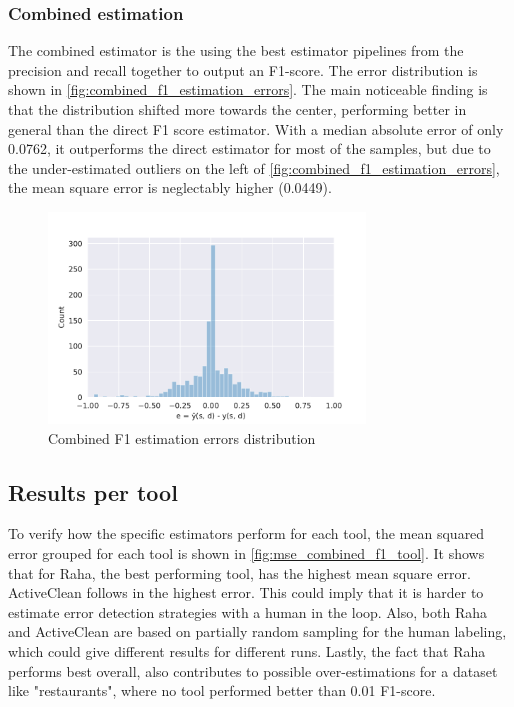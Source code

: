 \subsubsection{Combined estimation}
The combined estimator is the using the best estimator pipelines from the precision and recall together to output an F1-score. The error distribution is shown in \autoref{fig:combined_f1_estimation_errors}. The main noticeable finding is that the distribution shifted more towards the center, performing better in general than the direct F1 score estimator. With a median absolute error of only 0.0762, it outperforms the direct estimator for most of the samples, but due to the under-estimated outliers on the left of \autoref{fig:combined_f1_estimation_errors}, the mean square error is neglectably higher (0.0449). 

\begin{figure}[h]
    \centering
    \includegraphics[width=0.75\textwidth]{thesis/Figures/RQ2/15_error_histogramcell_f1_combined.pdf}
    \caption{Combined F1 estimation errors distribution}
    \label{fig:combined_f1_estimation_errors}
\end{figure}

\subsection{Results per tool}
To verify how the specific estimators perform for each tool, the mean squared error grouped for each tool is shown in \autoref{fig:mse_combined_f1_tool}. It shows that for Raha, the best performing tool, has the highest mean square error. ActiveClean follows in the highest error. This could imply that it is harder to estimate error detection strategies with a human in the loop. Also, both Raha and ActiveClean are based on partially random sampling for the human labeling, which could give different results for different runs. Lastly, the fact that Raha performs best overall, also contributes to possible over-estimations for a dataset like "restaurants", where no tool performed better than 0.01 F1-score. 


